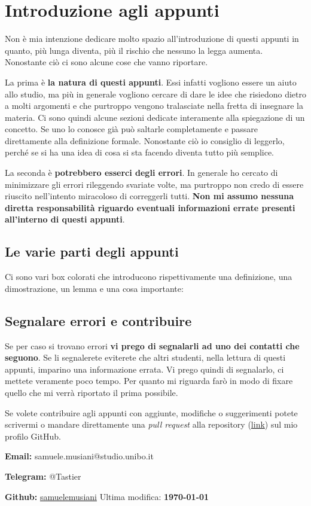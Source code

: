 \section{Introduzione agli appunti}

Non è mia intenzione dedicare molto spazio all'introduzione di questi appunti 
in quanto, più lunga diventa, più il rischio che nessuno la legga aumenta. 
Nonostante ciò ci sono alcune cose che vanno riportare. 

La prima è \textbf{la natura di questi appunti}. Essi infatti vogliono essere 
un aiuto allo studio, ma più in generale vogliono cercare di dare le idee che 
risiedono dietro a molti argomenti e che purtroppo vengono tralasciate nella 
fretta di insegnare la materia. Ci sono quindi alcune sezioni dedicate 
interamente alla spiegazione di un concetto. Se uno lo conosce già può saltarle 
completamente e passare direttamente alla definizione formale. Nonostante ciò 
io consiglio di leggerlo, perché se si ha una idea di cosa si sta facendo 
diventa tutto più semplice.\bigbreak

La seconda è \textbf{potrebbero esserci degli errori}. In generale ho cercato 
di minimizzare gli errori rileggendo svariate volte, ma purtroppo non credo di 
essere riuscito nell'intento miracoloso di correggerli tutti. \textbf{Non mi 
assumo nessuna diretta responsabilità riguardo eventuali informazioni errate 
presenti all'interno di questi appunti}.

\subsection{Le varie parti degli appunti}
Ci sono vari box colorati che introducono rispettivamente una definizione, una 
dimostrazione, un lemma e una cosa importante:






\subsection{Segnalare errori e contribuire}
Se per caso si trovano errori \textbf{vi prego di segnalarli ad uno dei 
contatti che seguono}. Se li segnalerete eviterete che altri studenti, nella 
lettura di questi appunti, imparino una informazione errata. Vi prego quindi di 
segnalarlo, ci mettete veramente poco tempo. Per quanto mi riguarda farò in 
modo di fixare quello che mi verrà riportato il prima possibile.\bigbreak

Se volete contribuire agli appunti con aggiunte, modifiche o suggerimenti 
potete scrivermi o mandare direttamente una \textit{pull request} alla 
repository (\href{https://github.com/samuelemusiani/Analisi}{link}) sul mio 
profilo GitHub.\bigbreak


\textbf{Email:} samuele.musiani@studio.unibo.it\bigbreak

\textbf{Telegram:} @Tastier\bigbreak

\textbf{Github:} \href{https://github.com/samuelemusiani}{samuelemusiani}
\hfill Ultima modifica: \textbf{\today}
